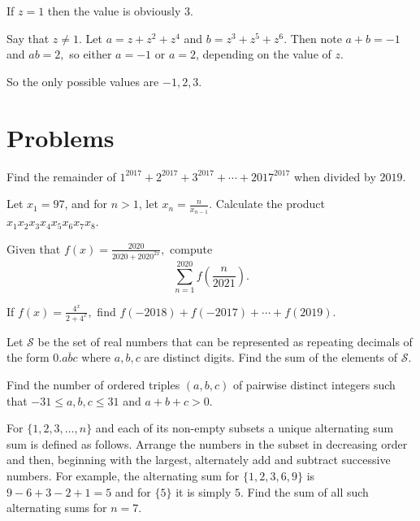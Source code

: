 \documentclass[mast]{lucky}
\begin{document}
\begin{sol}
If $z=1$ then the value is obviously $3.$

Say that $z\neq 1.$ Let $a=z+z^2+z^4$ and $b=z^3+z^5+z^6.$ Then note $a+b=-1$ and $ab=2,$ so either $a=-1$ or $a=2$, depending on the value of $z.$

So the only possible values are $-1,2,3.$
\end{sol}

\pagebreak

\section{Problems}



\begin{prob}[]{2}
Find the remainder of $1^{2017}+2^{2017}+3^{2017}+\cdots+2017^{2017}$ when divided by $2019.$
\end{prob}

\begin{prob}[AIME 1985/1]{2}
Let $x_1=97$, and for $n>1$, let $x_n=\frac{n}{x_{n-1}}$. Calculate the product $x_1x_2x_3x_4x_5x_6x_7x_8$.
\end{prob}

\begin{prob}[TrinMaC 2020/16]{3}
Given that $f(x)=\frac{2020}{2020+2020^{2x}},$ compute \[\sum\limits_{n=1}^{2020}f\left(\frac{n}{2021}\right).\]
\end{prob}

\begin{prob}[]{3}
If $f(x)=\frac{4^x}{2+4^x},$ find $f(-2018)+f(-2017)+\cdots+f(2019).$
\end{prob}

\begin{prob}[AIME I 2006/6]{3}
Let $\mathcal{S}$ be the set of real numbers that can be represented as repeating decimals of the form $0.\overline{abc}$ where $a, b, c$ are distinct digits. Find the sum of the elements of $\mathcal{S}.$
\end{prob}

\begin{req}{3}
Find the number of ordered triples $(a,b,c)$ of pairwise distinct integers such that $-31\leq a,b,c\leq 31$ and $a+b+c >0.$
\end{req}

\begin{prob}[AIME 1983/13]{4}
For $\{1, 2, 3, \ldots, n\}$ and each of its non-empty subsets a unique alternating sum sum is defined as follows. Arrange the numbers in the subset in decreasing order and then, beginning with the largest, alternately add and subtract successive numbers. For example, the alternating sum for $\{1, 2, 3, 6,9\}$ is $9-6+3-2+1=5$ and for $\{5\}$ it is simply $5$. Find the sum of all such alternating sums for $n=7$.
\end{prob}
\end{document}

